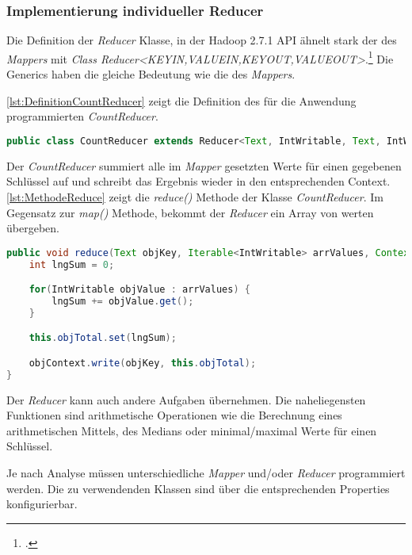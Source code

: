\subsubsection{Implementierung individueller Reducer}
Die Definition der \textit{Reducer} Klasse, in der Hadoop 2.7.1 \ac{API} ähnelt stark der des \textit{Mappers} mit \textit{Class Reducer<KEYIN,VALUEIN,KEYOUT,VALUEOUT>}.\footcite[Vgl.][]{ApacheHadoopApiDokuReducer.2015} Die Generics haben die gleiche Bedeutung wie die des \textit{Mappers}.

\autoref{lst:DefinitionCountReducer} zeigt die Definition des für die Anwendung programmierten \textit{CountReducer}.  \\

\begin{lstlisting}[language=Java,caption=Deklaration \textit{CountReducer} mit Generics,label=lst:DefinitionCountReducer]
public class CountReducer extends Reducer<Text, IntWritable, Text, IntWritable>
\end{lstlisting}

Der \textit{CountReducer} summiert alle im \textit{Mapper} gesetzten Werte für einen gegebenen Schlüssel auf und schreibt das Ergebnis wieder in den entsprechenden Context. \autoref{lst:MethodeReduce} zeigt die \textit{reduce()} Methode der Klasse \textit{CountReducer}. Im Gegensatz zur \textit{map()} Methode, bekommt der \textit{Reducer} ein Array von werten übergeben. \\

\begin{lstlisting}[language=Java,caption=Methode \textit{reduce()} der Klasse \textit{CountReducer},label=lst:MethodeReduce]
public void reduce(Text objKey, Iterable<IntWritable> arrValues, Context objContext) throws IOException, InterruptedException {
	int lngSum = 0;

	for(IntWritable objValue : arrValues) {
		lngSum += objValue.get();
	}

	this.objTotal.set(lngSum);

	objContext.write(objKey, this.objTotal);
}
\end{lstlisting}

Der \textit{Reducer} kann auch andere Aufgaben übernehmen. Die naheliegensten Funktionen sind arithmetische Operationen wie die Berechnung eines arithmetischen Mittels, des Medians oder minimal/maximal Werte für einen Schlüssel.

Je nach Analyse müssen unterschiedliche \textit{Mapper} und/oder \textit{Reducer} programmiert werden. Die zu verwendenden Klassen sind über die entsprechenden Properties konfigurierbar.

